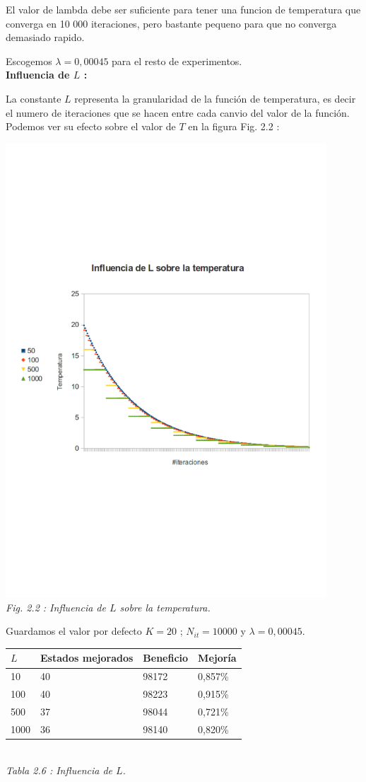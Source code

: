 \documentclass{article}
\begin{document}
El valor de lambda debe ser suficiente para tener una funcion de temperatura que
converga en 10 000 iteraciones, pero bastante pequeno para que no converga
demasiado rapido.

Escogemos $\lambda = 0,00045$ para el resto de experimentos.\\

\textbf{Influencia de $L$ : }

La constante $L$ representa la granularidad de la función de temperatura, es
decir el numero de iteraciones que se hacen entre cada canvio del valor de la
función. Podemos ver su efecto sobre el valor de $T$ en la figura Fig. 2.2 :
\begin{center}
\includegraphics[width=12cm]{L}\\
{\it Fig. 2.2 : Influencia de $L$ sobre la temperatura.}
\end{center}

Guardamos el valor por defecto $K=20$ ; $N_{it} = 10 000$ y $\lambda = 0,00045$.

\begin{center}
\begin{tabular}{|l||l|l|l|}
\hline
$L$ & Estados mejorados & Beneficio & Mejoría\\
\hline
10 & 40 & 98172 & 0,857\%\\
\hline
100 & 40 & 98223 & 0,915\%\\
\hline
500 & 37 & 98044 & 0,721\%\\
\hline
1000 & 36 & 98140 & 0,820\%\\
\hline
\end{tabular}\\
{\it Tabla 2.6 : Influencia de $L$.}
\end{center}
\end{document}

